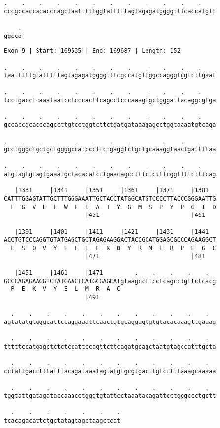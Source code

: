 \documentclass{article}
\begin{document}
\newpage
\begin{Verbatim}[fontfamily=courier]
    .    .    .    .    .    .    .    .    .    .    .    .
cccgccaccacacccagctaatttttggtatttttagtagagatggggtttcaccatgtt

    .
ggcca
\end{Verbatim}
\newpage
\begin{Verbatim}[fontfamily=courier]
Exon 9 | Start: 169535 | End: 169687 | Length: 152

.    .    .    .    .    .    .    .    .    .    .    .    
taatttttgtatttttagtagagatggggtttcgccatgttggccagggtggtcttgaat

.    .    .    .    .    .    .    .    .    .    .    .    
tcctgacctcaaataatcctcccacttcagcctcccaaagtgctgggattacaggcgtga

.    .    .    .    .    .    .    .    .    .    .    .    
gccaccgcacccagccttgtcctggtcttctgatgataaagagcctggtaaaatgtcaga

.    .    .    .    .    .    .    .    .    .    .    .    
gcctgggctgctgctggggccatcccttctgaggtctgctgcaaaggtaactgattttaa

.    .    .    .    .    .    .    .    .    .    .    .    
atgtagtgtagtgaaatgctacacatcttgaacagcctttctctttcggttttctttcag

   |1331     |1341     |1351     |1361     |1371     |1381  
CATTTGGAGTATTGCTTTGGGAAATTGCTACCTATGGCATGTCCCCTTACCCGGGAATTG
  F  G  V  L  L  W  E  I  A  T  Y  G  M  S  P  Y  P  G  I  D
                       |451                          |461   

   |1391     |1401     |1411     |1421     |1431     |1441  
ACCTGTCCCAGGTGTATGAGCTGCTAGAGAAGGACTACCGCATGGAGCGCCCAGAAGGCT
  L  S  Q  V  Y  E  L  L  E  K  D  Y  R  M  E  R  P  E  G  C
                       |471                          |481   

   |1451     |1461     |1471         .    .    .    .    .  
GCCCAGAGAAGGTCTATGAACTCATGCGAGCATgtaagccttcctcagcctgttctcacg
  P  E  K  V  Y  E  L  M  R  A  C                           
                       |491                                 

  .    .    .    .    .    .    .    .    .    .    .    .  
agtatatgtgggcattccaggaaattcaactgtgcaggagtgtgtacacaaagttgaaag

  .    .    .    .    .    .    .    .    .    .    .    .  
tttttccatgagctctctccattccagttcttcagatgcagctaatgtagccatttgcta

  .    .    .    .    .    .    .    .    .    .    .    .  
cctattgacctttatttacagataaatagtatgtgcgtgacttgtcttttaaagcaaaaa

  .    .    .    .    .    .    .    .    .    .    .    .  
tggtattgatagataccaaacctgggtgtattcctaaatacagattcctgggccctgctt

  .    .    .    .    .    .    .
tcacagacattctgctatagtagctaagctcat
\end{Verbatim}
\end{document}
